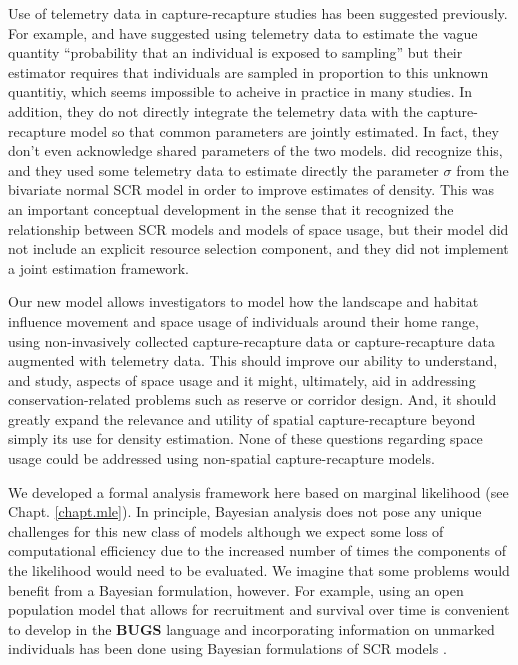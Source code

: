 Use of telemetry data in capture-recapture studies has been suggested
previously. For example, \citet{white_shenk:2001} and
\citet{ivan:2012} have suggested using telemetry data to estimate the
vague quantity ``probability that an individual is exposed to sampling'' but
their estimator requires that individuals are sampled in proportion to
this unknown quantitiy, which seems impossible to acheive in
practice in many studies. In
addition, they do not directly integrate the telemetry data with the
capture-recapture model so that common parameters are jointly
estimated. In fact, they don't even acknowledge shared parameters of
the two models.  \citet{sollmann_etal:inprep} did recognize this, and
they used some telemetry data to estimate directly the parameter
$\sigma$ from the bivariate normal SCR model in order to improve
estimates of density. This was an important conceptual development in
the sense that it recognized the relationship between SCR models and
models of space usage, but their model did not include an explicit
resource selection component, and they did not implement a joint
estimation framework.

Our new model allows investigators to model how the landscape and
habitat influence movement and space usage of individuals around their
home range, using non-invasively collected capture-recapture data or
capture-recapture data augmented with telemetry data.  This should
improve our ability to understand, and study, aspects of space usage
and it might, ultimately, aid in addressing conservation-related
problems such as reserve or corridor design. And, it should greatly
expand the relevance and utility of spatial capture-recapture beyond
simply its use for density estimation. None of these questions
regarding space usage could be addressed using non-spatial
capture-recapture models.

We developed a formal analysis framework here based on marginal
likelihood \citep{borchers_efford:2008} (see Chapt. \ref{chapt.mle}).
In principle, Bayesian analysis does not pose any unique challenges
for this new class of models although we expect some loss of
computational efficiency due to the increased number of times the
components of the likelihood would need to be evaluated.  We imagine
that some problems would benefit from a Bayesian formulation,
however. For example, using an open population model that allows for
recruitment and survival over time \citep{gardner_etal:2010} is
convenient to develop in the {\bf BUGS} language and incorporating
information on unmarked individuals has been done using Bayesian
formulations of SCR models \citep{chandler_royle:2012,
  sollmann_etal:2012}.

